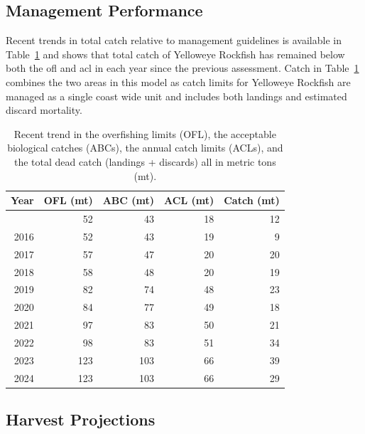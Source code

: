 \documentclass[
  english,
]{article}
\begin{document}
\clearpage

\subsection*{Management Performance}\label{management-performance}

Recent trends in total catch relative to management guidelines is
available in Table~\ref{tbl-es-management} and shows that total catch of
Yelloweye Rockfish has remained below both the \gls{ofl} and \gls{acl}
in each year since the previous assessment. Catch in
Table~\ref{tbl-es-management} combines the two areas in this model as
catch limits for Yelloweye Rockfish are managed as a single coast wide
unit and includes both landings and estimated discard mortality.

\begingroup
\fontsize{9.0pt}{11.0pt}\selectfont

\begin{longtable}{rrrrr}

\caption{\label{tbl-es-management}Recent trend in the overfishing limits
(OFL), the acceptable biological catches (ABCs), the annual catch limits
(ACLs), and the total dead catch (landings + discards) all in metric
tons (mt).}

\tabularnewline

\toprule
Year & OFL (mt) & ABC (mt) & ACL (mt) & Catch (mt) \\ 
\midrule\addlinespace[2.5pt]
2015 & 52 & 43 & 18 & 12 \\ 
2016 & 52 & 43 & 19 & 9 \\ 
2017 & 57 & 47 & 20 & 20 \\ 
2018 & 58 & 48 & 20 & 19 \\ 
2019 & 82 & 74 & 48 & 23 \\ 
2020 & 84 & 77 & 49 & 18 \\ 
2021 & 97 & 83 & 50 & 21 \\ 
2022 & 98 & 83 & 51 & 34 \\ 
2023 & 123 & 103 & 66 & 39 \\ 
2024 & 123 & 103 & 66 & 29 \\ 
\bottomrule

\end{longtable}

\endgroup

\subsection*{Harvest Projections}\label{harvest-projections}
\end{document}
